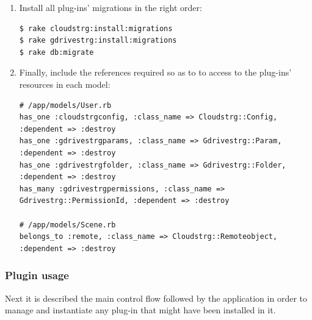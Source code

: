 \documentclass{article}
\begin{document}
\begin{enumerate}
\item Install all plug-ins' migrations in the right order:
\begin{verbatim}
$ rake cloudstrg:install:migrations
$ rake gdrivestrg:install:migrations
$ rake db:migrate
\end{verbatim}

\item Finally, include the references required so as to to access to the plug-ins' resources in each model:
\begin{verbatim}
# /app/models/User.rb
has_one :cloudstrgconfig, :class_name => Cloudstrg::Config, :dependent => :destroy
has_one :gdrivestrgparams, :class_name => Gdrivestrg::Param, :dependent => :destroy
has_one :gdrivestrgfolder, :class_name => Gdrivestrg::Folder, :dependent => :destroy
has_many :gdrivestrgpermissions, :class_name => Gdrivestrg::PermissionId, :dependent => :destroy

# /app/models/Scene.rb
belongs_to :remote, :class_name => Cloudstrg::Remoteobject, :dependent => :destroy
\end{verbatim}

\end{enumerate}

\subsubsection{Plugin usage}
Next it is described the main control flow followed by the application in order to manage and instantiate any plug-in that might have been installed in it.
\end{document}
